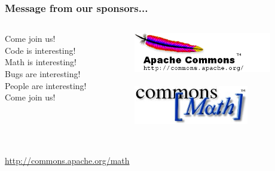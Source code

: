 \documentclass[14pt,mathserif]{beamer}
\begin{document}
\begin{frame}
  \frametitle{Message from our sponsors...}

\begin{columns}
\begin{column}{.5\textwidth}
Come join us! \\
 Code is interesting! \\
 Math is interesting! \\
 Bugs are interesting! \\
People are interesting! \\
Come join us! \\
\end{column}
\begin{column}{.5\textwidth}\raggedleft
\includegraphics[width=6cm]{commons-logo.png}\\~\\
\includegraphics[width=5cm]{math.jpg}
\end{column}
\end{columns}
\\
\url{http://commons.apache.org/math}
\end{frame}

\end{document}
